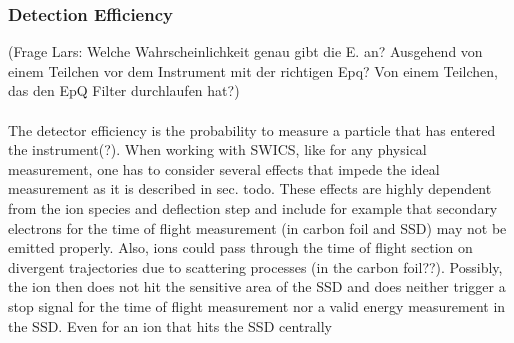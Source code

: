 \subsubsection{Detection Efficiency}
(Frage Lars: Welche Wahrscheinlichkeit genau gibt die E. an? Ausgehend von einem Teilchen vor dem Instrument mit der richtigen Epq? Von einem Teilchen, das den EpQ Filter durchlaufen hat?)\\ \\
The detector efficiency is the probability to measure a particle that has entered the instrument(?). 
When working with SWICS, like for any physical measurement, one has to consider several effects that impede the ideal measurement as it is described in sec. todo. 
These effects are highly dependent from the ion species and deflection step and include for example that secondary electrons for the time of flight measurement (in carbon foil and SSD) may not be emitted properly. Also, ions could pass through the time of flight section on divergent trajectories due to scattering processes (in the carbon foil??). Possibly, the ion then does not hit the sensitive area of the SSD and does neither trigger a stop signal for the time of flight measurement nor a valid energy measurement in the SSD. Even for an ion that hits the SSD centrally


